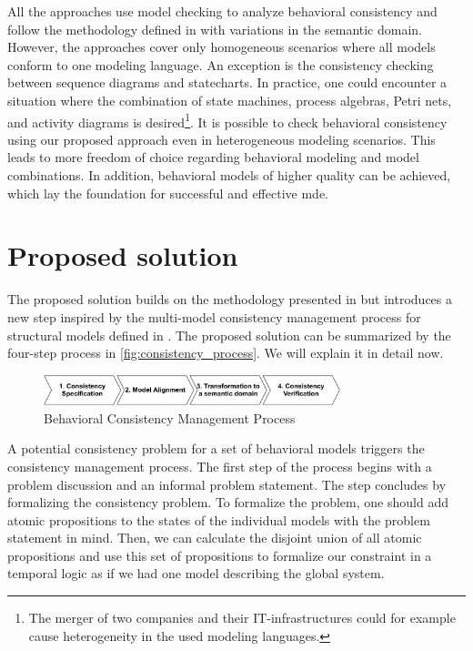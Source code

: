 \documentclass[conference]{IEEEtran}
\begin{document}
All the approaches use model checking to analyze behavioral consistency and follow the methodology defined in \cite{engelsMethodologySpecifyingAnalyzing2001} with variations in the semantic domain.
However, the approaches cover only homogeneous scenarios where all models conform to one modeling language.
An exception is the consistency checking between sequence diagrams and statecharts.
In practice, one could encounter a situation where the combination of state machines, process algebras, Petri nets, and activity diagrams is desired\footnote{The merger of two companies and their IT-infrastructures could for example cause heterogeneity in the used modeling languages.}.
It is possible to check behavioral consistency using our proposed approach even in heterogeneous modeling scenarios.
This leads to more freedom of choice regarding behavioral modeling and model combinations.
In addition, behavioral models of higher quality can be achieved, which lay the foundation for successful and effective \gls{mde}.

\section{Proposed solution}
The proposed solution builds on the methodology presented in \cite{engelsMethodologySpecifyingAnalyzing2001} but introduces a new step inspired by the multi-model consistency management process for structural models defined in \cite{stunkelMultipleModelSynchronization2020}.
The proposed solution can be summarized by the four-step process in \autoref{fig:consistency_process}.
We will explain it in detail now.

\begin{figure}[h]
    \centering
    \includegraphics[width=3.4in]{methodology}
    \caption{Behavioral Consistency Management Process}
    \label{fig:consistency_process}
\end{figure}
A potential consistency problem for a set of behavioral models triggers the consistency management process.
The first step of the process begins with a problem discussion and an informal problem statement.
The step concludes by formalizing the consistency problem.
To formalize the problem, one should add atomic propositions to the states of the individual models with the problem statement in mind.
Then, we can calculate the disjoint union of all atomic propositions and use this set of propositions to formalize our constraint in a temporal logic as if we had one model describing the global system.
\end{document}
